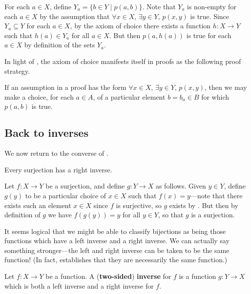 \begin{cproof}
For each $a \in X$, define $Y_a = \{ b \in Y \mid p(a,b) \}$. Note that $Y_a$ is non-empty for each $a \in X$ by the assumption that $\forall x \in X,\, \exists y \in Y,\, p(x,y)$ is true. Since $Y_a \subseteq Y$ for each $a \in X$, by the axiom of choice there exists a function $h : X \to Y$ such that $h(a) \in Y_a$ for all $a \in X$. But then $p(a,h(a))$ is true for each $a \in X$ by definition of the sets $Y_a$.
\end{cproof}

In light of , the axiom of choice manifests itself in proofs as the following proof strategy.

\begin{strategyac}
\label{strUsingAC}
If an assumption in a proof has the form $\forall x \in X,\, \exists y \in Y,\, p(x,y)$, then we may make a choice, for each $a \in A$, of a particular element $b = b_a \in B$ for which $p(a,b)$ is true.
\end{strategyac}

\subsection*{Back to inverses}

We now return to the converse of .

\begin{propositionac}
Every surjection has a right inverse.
\end{propositionac}

\begin{cproof}
Let $f : X \to Y$ be a surjection, and define $g : Y \to X$ as follows. Given $y \in Y$, define $g(y)$ to be a particular choice of $x \in X$ such that $f(x) = y$---note that there exists such an element $x \in X$ since $f$ is surjective, so $g$ exists by . But then by definition of $g$ we have $f(g(y)) = y$ for all $y \in Y$, so that $g$ is a surjection.
\end{cproof}

It seems logical that we might be able to classify bijections as being those functions which have a left inverse and a right inverse. We can actually say something stronger---the left and right inverse can be taken to be the same function! (In fact,  establishes that they are necessarily the same function.)

\begin{definition}
\label{defInverse}
Let $f : X \to Y$ be a function. A (\textbf{two-sided}) \textbf{inverse} for $f$ is a function $g : Y \to X$ which is both a left inverse and a right inverse for $f$.
\end{definition}

